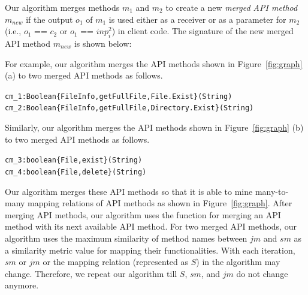 

Our algorithm merges methods $m_1$ and $m_2$ to create a new \emph{merged API
method} $m_{new}$ if the output $o_1$ of $m_1$ is used either as a
receiver or as a parameter for $m_2$ (i.e., $o_1$ == $c_2$ or $o_1$
== $inp_i^2$) in client code. The signature of the new merged API
method $m_{new}$ is shown below:


For example, our algorithm merges the API methods shown in Figure~\ref{fig:graph} (a) to two merged API methods as follows.

\begin{CodeOut}\vspace*{-1.8ex}
\begin{alltt}
cm_1:Boolean \{FileInfo,getFullFile,File.Exist\}(String)
cm_2:Boolean \{FileInfo,getFullFile,Directory.Exist\}(String)
\end{alltt}
\end{CodeOut}\vspace*{-1.8ex}

Similarly, our algorithm merges the API methods shown in Figure~\ref{fig:graph} (b) to two merged API methods as follows.

\begin{CodeOut}\vspace*{-2ex}
\begin{alltt}
cm_3:boolean \{File,exist\}(String)
cm_4:boolean \{File,delete\}(String)
\end{alltt}
\end{CodeOut}\vspace*{-2ex}

Our algorithm merges these API methods so that it is able to mine many-to-many mapping relations of API methods as shown in Figure~\ref{fig:graph}. After merging API methods, our algorithm uses the  function for merging an API method with its
next available API method. For two merged API methods, our algorithm uses the
maximum similarity of method names between $jm$ and $sm$ as a
similarity metric value for mapping their functionalities.
With each iteration, $sm$ or $jm$ or the mapping relation (represented as $S$)
in the algorithm may change. Therefore, we repeat our algorithm
till $S$, $sm$, and $jm$ do not change anymore.

